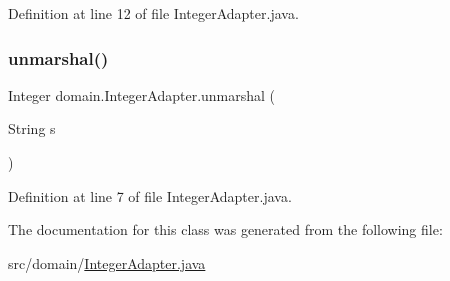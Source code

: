 Definition at line 12 of file Integer\+Adapter.\+java.


\begin{DoxyCode}{0}

\end{DoxyCode}
\mbox{\label{classdomain_1_1IntegerAdapter_ad2bfc5af140573682dd03906b9264b51}} 
\subsubsection{\texorpdfstring{unmarshal()}{unmarshal()}}
{\footnotesize\ttfamily Integer domain.\+Integer\+Adapter.\+unmarshal (\begin{DoxyParamCaption}\item[{String}]{s }\end{DoxyParamCaption})}



Definition at line 7 of file Integer\+Adapter.\+java.


\begin{DoxyCode}{0}

\end{DoxyCode}


The documentation for this class was generated from the following file\+:\begin{DoxyCompactItemize}
\item 
src/domain/\mbox{\hyperlink{IntegerAdapter_8java}{Integer\+Adapter.\+java}}\end{DoxyCompactItemize}
